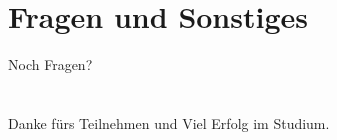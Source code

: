 \section{Fragen und Sonstiges}
\begin{frame}
    \slidehead
    \vspace{1.8cm}
    \centering
    \huge Noch Fragen?
\end{frame}

\section{}
\subsection{}

\begin{frame}
    \slidehead
    \vspace{1.8cm}
    \centering
    \huge Danke fürs Teilnehmen und Viel Erfolg im Studium.
\end{frame}


